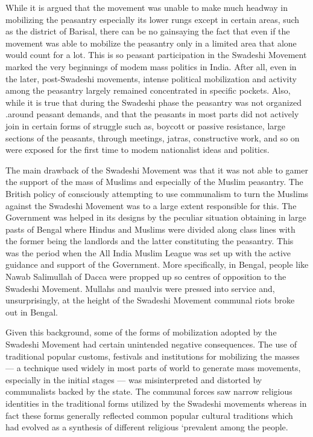 While it is argued that the movement was unable to make much headway in mobilizing the peasantry especially its lower rungs except in certain areas, such as the district of Barisal, there can be no gainsaying the fact that even if the movement was able to mobilize the peasantry only in a limited area that alone would count for a lot. This is so peasant participation in the Swadeshi Movement marked the very beginnings of modem mass politics in India. After all, even in the later, post-Swadeshi movements, intense political mobilization and activity among the peasantry largely remained concentrated in specific pockets. Also, while it is true that during the Swadeshi phase the peasantry was not organized .around peasant demands, and that the peasants in most parts did not actively join in certain forms of struggle such as, boycott or passive resistance, large sections of the peasants, through meetings, jatras, constructive work, and so on were exposed for the first time to modem nationalist ideas and politics.

The main drawback of the Swadeshi Movement was that it was not able to gamer the support of the mass of Muslims and especially of the Muslim peasantry. The British policy of consciously attempting to use communalism to turn the Muslims against the Swadeshi Movement was to a large extent responsible for this. The Government was helped in its designs by the peculiar situation obtaining in large pasts of Bengal where Hindus and Muslims were divided along class lines with the former being the landlords and the latter constituting the peasantry. This was the period when the All India Muslim League was set up with the active guidance and support of the Government. More specifically, in Bengal, people like Nawab Salimullah of Dacca were propped up so centres of opposition to the Swadeshi Movement. Mullahs and maulvis were pressed into service and, unsurprisingly, at the height of the Swadeshi Movement communal riots broke out in Bengal.

Given this background, some of the forms of mobilization adopted by the Swadeshi Movement had certain unintended negative consequences. The use of traditional popular customs, festivals and institutions for mobilizing the masses --- a technique used widely in most parts of world to generate mass movements, especially in the initial stages --- was misinterpreted and distorted by communalists backed by the state. The communal forces saw narrow religious identities in the traditional forms utilized by the Swadeshi movements whereas in fact these forms generally reflected common popular cultural traditions which had evolved as a synthesis of different religious `prevalent among the people.

